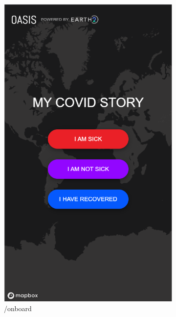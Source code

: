 \documentclass{ucsdreport}
\begin{document}
\begin{figure}[H]
	\begin{subfigure}{.33\textwidth}
	    \centering
		\includegraphics[scale = 0.47]{images/update1.PNG}
		\caption{/onboard}
	\end{subfigure}
	\begin{subfigure}{.33\textwidth}
	    \centering

\end{subfigure}
\end{figure}
\end{document}
